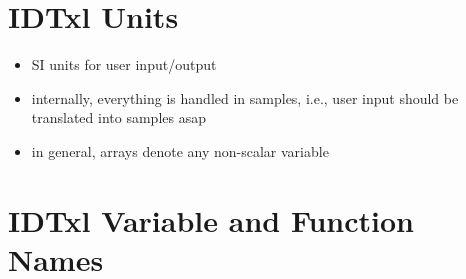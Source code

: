 \documentclass[%
10pt,								%
]
{scrartcl}
\begin{document}
\section{IDTxl Units}

\begin{itemize}
 \item SI units for user input/output
 \item internally, everything is handled in samples, i.e., user input should be translated into samples asap
 \item in general, arrays denote any non-scalar variable
\end{itemize}


\section{IDTxl Variable and Function Names}
\end{document}
